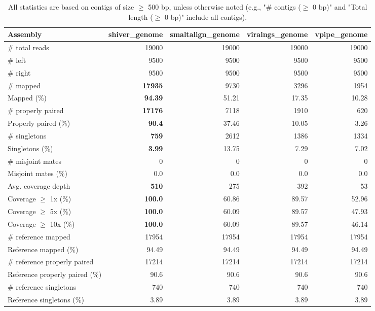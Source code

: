 \documentclass[12pt,a4paper]{article}
\begin{document}
\begin{table}[ht]
\begin{center}
\caption{All statistics are based on contigs of size $\geq$ 500 bp, unless otherwise noted (e.g., "\# contigs ($\geq$ 0 bp)" and "Total length ($\geq$ 0 bp)" include all contigs).}
\begin{tabular}{|l*{4}{|r}|}
\hline
Assembly & shiver\_genome & smaltalign\_genome & viralngs\_genome & vpipe\_genome \\ \hline
\# total reads & 19000 & 19000 & 19000 & 19000 \\ \hline
\# left & 9500 & 9500 & 9500 & 9500 \\ \hline
\# right & 9500 & 9500 & 9500 & 9500 \\ \hline
\# mapped & {\bf 17935} & 9730 & 3296 & 1954 \\ \hline
Mapped (\%) & {\bf 94.39} & 51.21 & 17.35 & 10.28 \\ \hline
\# properly paired & {\bf 17176} & 7118 & 1910 & 620 \\ \hline
Properly paired (\%) & {\bf 90.4} & 37.46 & 10.05 & 3.26 \\ \hline
\# singletons & {\bf 759} & 2612 & 1386 & 1334 \\ \hline
Singletons (\%) & {\bf 3.99} & 13.75 & 7.29 & 7.02 \\ \hline
\# misjoint mates & 0 & 0 & 0 & 0 \\ \hline
Misjoint mates (\%) & 0.0 & 0.0 & 0.0 & 0.0 \\ \hline
Avg. coverage depth & {\bf 510} & 275 & 392 & 53 \\ \hline
Coverage $\geq$ 1x (\%) & {\bf 100.0} & 60.86 & 89.57 & 52.96 \\ \hline
Coverage $\geq$ 5x (\%) & {\bf 100.0} & 60.09 & 89.57 & 47.93 \\ \hline
Coverage $\geq$ 10x (\%) & {\bf 100.0} & 60.09 & 89.57 & 46.14 \\ \hline
\# reference mapped & 17954 & 17954 & 17954 & 17954 \\ \hline
Reference mapped (\%) & 94.49 & 94.49 & 94.49 & 94.49 \\ \hline
\# reference properly paired & 17214 & 17214 & 17214 & 17214 \\ \hline
Reference properly paired (\%) & 90.6 & 90.6 & 90.6 & 90.6 \\ \hline
\# reference singletons & 740 & 740 & 740 & 740 \\ \hline
Reference singletons (\%) & 3.89 & 3.89 & 3.89 & 3.89 \\ \hline

\end{tabular}
\end{center}
\end{table}
\end{document}
